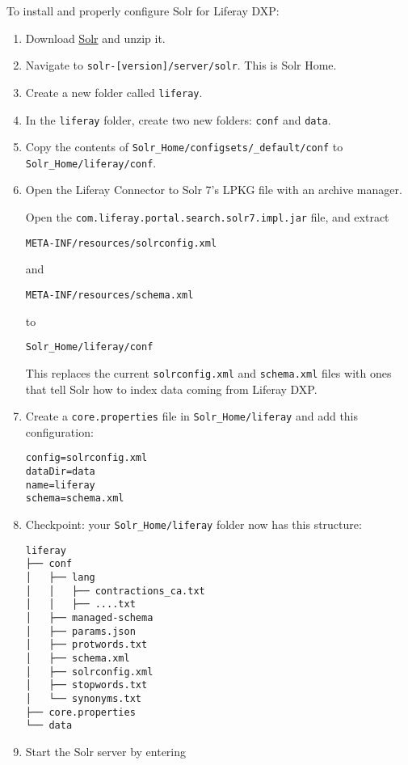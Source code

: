 To install and properly configure Solr for Liferay DXP:

\begin{enumerate}
\def\labelenumi{\arabic{enumi}.}
\item
  Download
  \href{http://archive.apache.org/dist/lucene/solr/7.5.0/}{Solr} and
  unzip it.
\item
  Navigate to \texttt{solr-{[}version{]}/server/solr}. This is Solr
  Home.
\item
  Create a new folder called \texttt{liferay}.
\item
  In the \texttt{liferay} folder, create two new folders: \texttt{conf}
  and \texttt{data}.
\item
  Copy the contents of \texttt{Solr\_Home/configsets/\_default/conf} to
  \texttt{Solr\_Home/liferay/conf}.
\item
  Open the Liferay Connector to Solr 7's LPKG file with an archive
  manager.

  Open the \texttt{com.liferay.portal.search.solr7.impl.jar} file, and
  extract

\begin{verbatim}
META-INF/resources/solrconfig.xml
\end{verbatim}

  and

\begin{verbatim}
META-INF/resources/schema.xml
\end{verbatim}

  to

\begin{verbatim}
Solr_Home/liferay/conf
\end{verbatim}

  This replaces the current \texttt{solrconfig.xml} and
  \texttt{schema.xml} files with ones that tell Solr how to index data
  coming from Liferay DXP.
\item
  Create a \texttt{core.properties} file in \texttt{Solr\_Home/liferay}
  and add this configuration:

\begin{verbatim}
config=solrconfig.xml
dataDir=data
name=liferay
schema=schema.xml
\end{verbatim}
\item
  Checkpoint: your \texttt{Solr\_Home/liferay} folder now has this
  structure:

\begin{verbatim}
liferay
├── conf
│   ├── lang
│   │   ├── contractions_ca.txt
│   │   ├── ....txt
│   ├── managed-schema
│   ├── params.json
│   ├── protwords.txt
│   ├── schema.xml
│   ├── solrconfig.xml
│   ├── stopwords.txt
│   └── synonyms.txt
├── core.properties
└── data
\end{verbatim}
\item
  Start the Solr server by entering


\end{enumerate}
